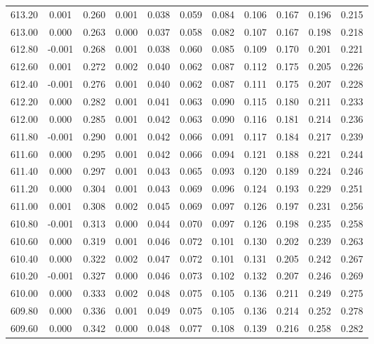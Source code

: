 \begin{longtable}{cccccccccc}
    613.20 &  0.001 &  0.260 &  0.001 &  0.038 &  0.059 &  0.084 &  0.106 &  0.167 &  0.196 &  0.215 \\
    613.00 &  0.000 &  0.263 &  0.000 &  0.037 &  0.058 &  0.082 &  0.107 &  0.167 &  0.198 &  0.218 \\
    612.80 & -0.001 &  0.268 &  0.001 &  0.038 &  0.060 &  0.085 &  0.109 &  0.170 &  0.201 &  0.221 \\
    612.60 &  0.001 &  0.272 &  0.002 &  0.040 &  0.062 &  0.087 &  0.112 &  0.175 &  0.205 &  0.226 \\
    612.40 & -0.001 &  0.276 &  0.001 &  0.040 &  0.062 &  0.087 &  0.111 &  0.175 &  0.207 &  0.228 \\
    612.20 &  0.000 &  0.282 &  0.001 &  0.041 &  0.063 &  0.090 &  0.115 &  0.180 &  0.211 &  0.233 \\
    612.00 &  0.000 &  0.285 &  0.001 &  0.042 &  0.063 &  0.090 &  0.116 &  0.181 &  0.214 &  0.236 \\
    611.80 & -0.001 &  0.290 &  0.001 &  0.042 &  0.066 &  0.091 &  0.117 &  0.184 &  0.217 &  0.239 \\
    611.60 &  0.000 &  0.295 &  0.001 &  0.042 &  0.066 &  0.094 &  0.121 &  0.188 &  0.221 &  0.244 \\
    611.40 &  0.000 &  0.297 &  0.001 &  0.043 &  0.065 &  0.093 &  0.120 &  0.189 &  0.224 &  0.246 \\
    611.20 &  0.000 &  0.304 &  0.001 &  0.043 &  0.069 &  0.096 &  0.124 &  0.193 &  0.229 &  0.251 \\
    611.00 &  0.001 &  0.308 &  0.002 &  0.045 &  0.069 &  0.097 &  0.126 &  0.197 &  0.231 &  0.256 \\
    610.80 & -0.001 &  0.313 &  0.000 &  0.044 &  0.070 &  0.097 &  0.126 &  0.198 &  0.235 &  0.258 \\
    610.60 &  0.000 &  0.319 &  0.001 &  0.046 &  0.072 &  0.101 &  0.130 &  0.202 &  0.239 &  0.263 \\
    610.40 &  0.000 &  0.322 &  0.002 &  0.047 &  0.072 &  0.101 &  0.131 &  0.205 &  0.242 &  0.267 \\
    610.20 & -0.001 &  0.327 &  0.000 &  0.046 &  0.073 &  0.102 &  0.132 &  0.207 &  0.246 &  0.269 \\
    610.00 &  0.000 &  0.333 &  0.002 &  0.048 &  0.075 &  0.105 &  0.136 &  0.211 &  0.249 &  0.275 \\
    609.80 &  0.000 &  0.336 &  0.001 &  0.049 &  0.075 &  0.105 &  0.136 &  0.214 &  0.252 &  0.278 \\
    609.60 &  0.000 &  0.342 &  0.000 &  0.048 &  0.077 &  0.108 &  0.139 &  0.216 &  0.258 &  0.282 \\

\end{longtable}
